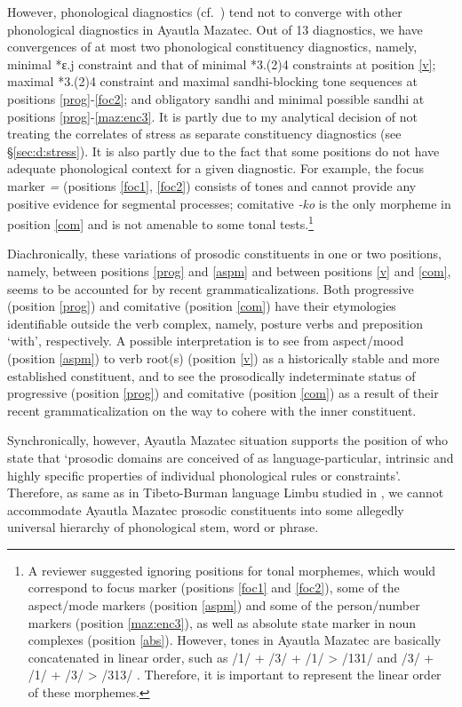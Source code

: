 \documentclass[output=paper]{langscibook}
\begin{document}
However, phonological diagnostics (cf.~) tend not to converge with other phonological diagnostics in Ayautla Mazatec.  Out of 13 diagnostics, we have convergences of at most two phonological constituency diagnostics, namely, minimal *ɛ.j constraint and that of minimal *3.(2)4 constraints at position \ref{v}; maximal *3.(2)4 constraint and maximal sandhi-blocking tone sequences at positions \ref{prog}-\ref{foc2}; and obligatory sandhi and minimal possible sandhi at positions \ref{prog}-\ref{maz:enc3}. It is partly due to my analytical decision of not treating the correlates of stress as separate constituency diagnostics (see \S\ref{sec:d:stress}). It is also partly due to the fact that some positions do not have adequate phonological context for a given diagnostic. For example, the focus marker \textit{=\3\ff} (positions \ref{foc1}, \ref{foc2}) consists of tones and cannot provide any positive evidence for segmental processes; comitative \textit{-ko\1\3} is the only morpheme in position \ref{com} and is not amenable to some tonal tests.\footnote{A reviewer suggested ignoring positions for tonal morphemes, which would correspond to focus marker (positions \ref{foc1} and \ref{foc2}), some of the aspect/mode markers (position \ref{aspm}) and some of the person/number markers (position \ref{maz:enc3}), as well as absolute state marker in noun complexes (position \ref{abs}). However, tones in Ayautla Mazatec are basically concatenated in linear order, such as /1/ + /3/ + /1/ >{} /131/ and /3/ + /1/ + /3/ >{} /313/ \citep[cf.][196--207]{nakamoto20}. Therefore, it is important to represent the linear order of these morphemes.}

Diachronically, these variations of prosodic constituents in one or two positions, namely, between positions \ref{prog} and \ref{aspm} and between positions \ref{v} and \ref{com}, seems to be accounted for by recent grammaticalizations.
Both progressive (position \ref{prog}) and comitative (position \ref{com}) have their etymologies identifiable outside the verb complex, namely, posture verbs and preposition `with', respectively.
A possible interpretation is to see from aspect/mood (position \ref{aspm}) to verb root(s) (position \ref{v}) as a historically stable and more established constituent, and to see the prosodically indeterminate status of progressive (position \ref{prog}) and comitative (position \ref{com}) as a result of their recent grammaticalization on the way to cohere with the inner constituent.

Synchronically, however, Ayautla Mazatec situation supports the position of \citet[704]{Schiering2010} who state that `prosodic domains are conceived of as language-particular, intrinsic and highly specific properties of individual phonological rules or constraints'. Therefore, as same as in Tibeto-Burman language Limbu studied in \citet{Schiering2010}, we cannot accommodate Ayautla Mazatec prosodic constituents into some allegedly universal hierarchy of phonological stem, word or phrase.
\end{document}
